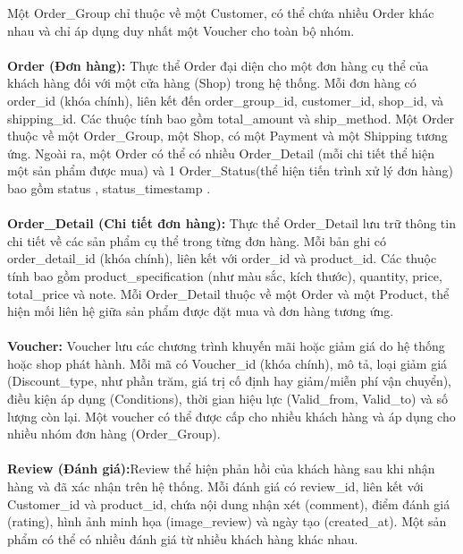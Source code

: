 Một Order\_Group chỉ thuộc về một Customer, có thể chứa nhiều Order khác nhau và chỉ áp dụng duy nhất một Voucher 
cho toàn bộ nhóm.  \\ \\ 
\hspace*{2em} \textbf{Order (Đơn hàng):} Thực thể Order đại diện cho một đơn hàng cụ thể của khách hàng đối với một cửa hàng (Shop) 
trong hệ thống. Mỗi đơn hàng có order\_id (khóa chính), liên kết đến order\_group\_id, customer\_id, shop\_id, 
và shipping\_id. Các thuộc tính bao gồm total\_amount và ship\_method.
Một Order thuộc về một Order\_Group, một Shop, có một Payment và một Shipping tương ứng. 
Ngoài ra, một Order có thể có nhiều Order\_Detail (mỗi chi tiết thể hiện một sản phẩm được mua) và 
1 Order\_Status(thể hiện tiến trình xử lý đơn hàng) bao gồm status , status\_timestamp .   \\ \\
\hspace*{2em} \textbf{Order\_Detail (Chi tiết đơn hàng):}
Thực thể Order\_Detail lưu trữ thông tin chi tiết về các sản phẩm cụ thể trong từng đơn hàng. Mỗi bản ghi có order\_detail\_id (khóa chính), liên kết với order\_id và product\_id. Các thuộc tính bao gồm product\_specification (như màu sắc, kích thước), quantity, price, total\_price và note.
Mỗi Order\_Detail thuộc về một Order và một Product, thể hiện mối liên hệ giữa sản phẩm được đặt mua và đơn hàng tương ứng.
\\ \\ \hspace*{2em} \textbf{Voucher:} Voucher lưu các chương trình khuyến mãi hoặc giảm giá do hệ thống hoặc shop phát hành. 
Mỗi mã có Voucher\_id (khóa chính), mô tả, loại giảm giá (Discount\_type, như phần trăm, giá trị cố định hay giảm/miễn phí vận chuyển), 
điều kiện áp dụng (Conditions), thời gian hiệu lực (Valid\_from, Valid\_to) và số lượng còn lại. 
Một voucher có thể được cấp cho nhiều khách hàng và áp dụng cho nhiều nhóm đơn hàng (Order\_Group). \\ \\
\hspace*{2em} \textbf{Review (Đánh giá):}Review thể hiện phản hồi của khách hàng sau khi nhận hàng và đã xác nhận trên hệ thống. 
Mỗi đánh giá có review\_id, liên kết với Customer\_id và product\_id, chứa nội dung nhận xét (comment), 
điểm đánh giá (rating), hình ảnh minh họa (image\_review) và ngày tạo (created\_at). 
Một sản phẩm có thể có nhiều đánh giá từ nhiều khách hàng khác nhau. \\ \\ 
